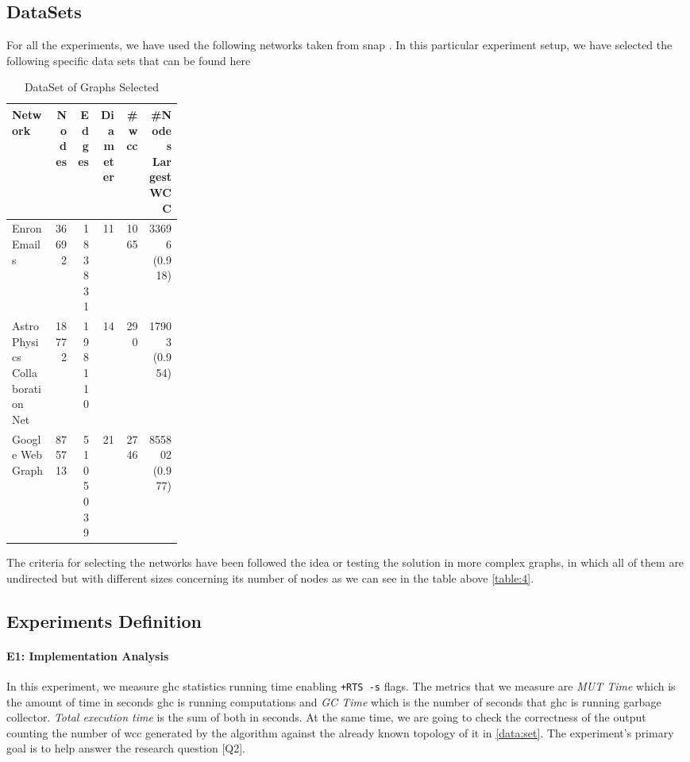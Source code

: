\documentclass[preprint]{elsarticle}
\begin{document}
\subsection{DataSets}\label{data:set}

For all the experiments, we have used the following networks taken from \acrshort{snap} \cite{stanford}. In this particular experiment setup, we have selected the following specific data sets that can be found here \cite{netenron, netastro, netwebgoogle}

\begin{table}[H]
  \centering
  \begin{tabular}{|p{0.25\linewidth}|r|r|r|r|r|}
   \hline
   \textbf{Network} & \textbf{Nodes} & \textbf{Edges} & \textbf{Diameter} & \textbf{\#\acrshort{wcc}} & \textbf{\#Nodes Largest WCC} \\
   \hline
   Enron Emails & 36692 & 183831 & 11 & 1065 & 33696 (0.918) \\
   \hline
   Astro Physics Collaboration Net & 18772 & 198110 & 14 & 290 & 17903 (0.954)\\
   \hline
   Google Web Graph & 875713 & 5105039 & 21 & 2746 & 855802 (0.977)\\
   \hline
  \end{tabular}
 \caption{DataSet of Graphs Selected}
 \label{table:4}
 \end{table}
 
 The criteria for selecting the networks have been followed the idea or testing the solution in more complex graphs, in which all of them are undirected but with different sizes concerning its number of nodes as we can see in the table above \autoref{table:4}. 

\subsection{Experiments Definition}\label{sub:exp:def}
\paragraph{E1: Implementation Analysis}
In this experiment, we measure \acrshort{ghc} statistics running time enabling \texttt{+RTS -s} flags. The metrics that we measure are \emph{MUT Time} which is the amount of time in seconds \acrshort{ghc} is running computations and \emph{GC Time} which is the number of seconds that \acrshort{ghc} is running garbage collector. \emph{Total execution time} is the sum of both in seconds. At the same time, we are going to check the correctness of the output counting the number of \acrshort{wcc} generated by the algorithm against the already known topology of it in \autoref{data:set}. The experiment's primary goal is to help answer the research question [Q2].
\end{document}
